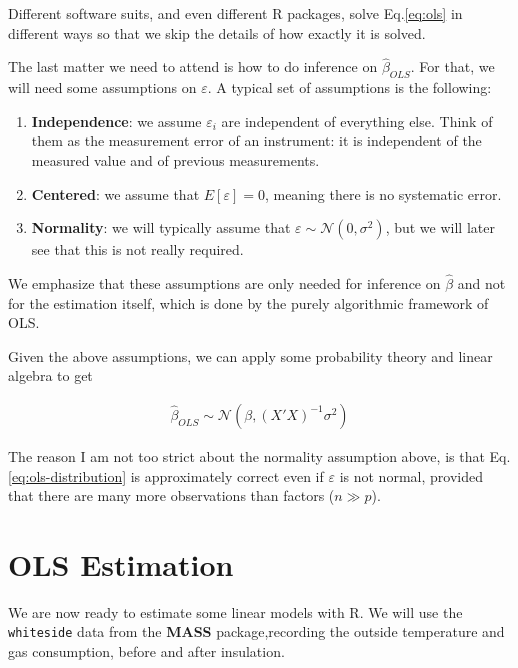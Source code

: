 \documentclass[]{book}
\providecommand{\tightlist}{%
  \setlength{\itemsep}{0pt}\setlength{\parskip}{0pt}}
\theoremstyle{definition}
\theoremstyle{definition}
\theoremstyle{remark}
\begin{document}
Different software suits, and even different R packages, solve
Eq.\eqref{eq:ols} in different ways so that we skip the details of how
exactly it is solved.

The last matter we need to attend is how to do inference on
\(\hat \beta_{OLS}\). For that, we will need some assumptions on
\(\varepsilon\). A typical set of assumptions is the following:

\begin{enumerate}
\def\labelenumi{\arabic{enumi}.}
\tightlist
\item
  \textbf{Independence}: we assume \(\varepsilon_i\) are independent of
  everything else. Think of them as the measurement error of an
  instrument: it is independent of the measured value and of previous
  measurements.
\item
  \textbf{Centered}: we assume that \(E[\varepsilon]=0\), meaning there
  is no systematic error.
\item
  \textbf{Normality}: we will typically assume that
  \(\varepsilon \sim \mathcal{N}(0,\sigma^2)\), but we will later see
  that this is not really required.
\end{enumerate}

We emphasize that these assumptions are only needed for inference on
\(\hat \beta\) and not for the estimation itself, which is done by the
purely algorithmic framework of OLS.

Given the above assumptions, we can apply some probability theory and
linear algebra to get

\begin{align}
  \hat \beta_{OLS} \sim \mathcal{N}(\beta, (X'X)^{-1} \sigma^2)
  \label{eq:ols-distribution}
\end{align}

The reason I am not too strict about the normality assumption above, is
that Eq.\eqref{eq:ols-distribution} is approximately correct even if
\(\varepsilon\) is not normal, provided that there are many more
observations than factors (\(n \gg p\)).

\section{OLS Estimation}\label{ols-estimation}

We are now ready to estimate some linear models with R. We will use the
\texttt{whiteside} data from the \textbf{MASS} package,recording the
outside temperature and gas consumption, before and after insulation.
\end{document}
